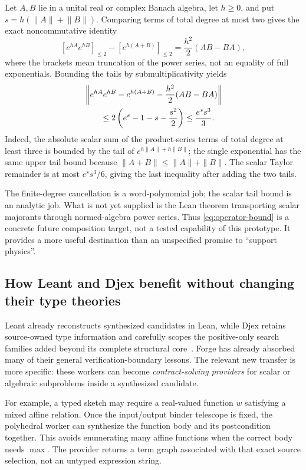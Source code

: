 Let \(A,B\) lie in a unital real or complex Banach algebra, let \(h\ge0\), and put \(s=h(\lVert A\rVert+\lVert B\rVert)\). Comparing terms of total degree at most two gives the exact noncommutative identity
\[
 [e^{hA}e^{hB}]_{\le2}-[e^{h(A+B)}]_{\le2}
 =\frac{h^2}{2}(AB-BA),
\]
where the brackets mean truncation of the power series, not an equality of full exponentials. Bounding the tails by submultiplicativity yields
\begin{align}\label{eq:operator-bound}
 &\left\|e^{hA}e^{hB}-e^{h(A+B)}
       -\frac{h^2}{2}(AB-BA)\right\|\notag\\
 &\hspace{2em}\le
 2\left(e^s-1-s-\frac{s^2}{2}\right)
 \le \frac{e^s s^3}{3}.
\end{align}
Indeed, the absolute scalar sum of the product-series terms of total degree at least three is bounded by the tail of \(e^{h\|A\|+h\|B\|}\); the single exponential has the same upper tail bound because \(\|A+B\|\le\|A\|+\|B\|\). The scalar Taylor remainder is at most \(e^ss^3/6\), giving the last inequality after adding the two tails.

The finite-degree cancellation is a word-polynomial job; the scalar tail bound is an analytic job. What is not yet supplied is the Lean theorem transporting scalar majorants through normed-algebra power series. Thus \eqref{eq:operator-bound} is a concrete future composition target, not a tested capability of this prototype. It provides a more useful destination than an unspecified promise to ``support physics''.

\subsection{How Leant and Djex benefit without changing their type theories}
Leant already reconstructs synthesized candidates in Lean, while Djex retains source-owned type information and carefully scopes the positive-only search families added beyond its complete structural core~\cite{leant,djex}. Forge has already absorbed many of their general verification-boundary lessons. The relevant new transfer is more specific: these workers can become \emph{contract-solving providers} for scalar or algebraic subproblems inside a synthesized candidate.

For example, a typed sketch may require a real-valued function \(w\) satisfying a mixed affine relation. Once the input/output binder telescope is fixed, the polyhedral worker can synthesize the function body and its postcondition together. This avoids enumerating many affine functions when the correct body needs \(\max\). The provider returns a term graph associated with that exact source selection, not an untyped expression string.

